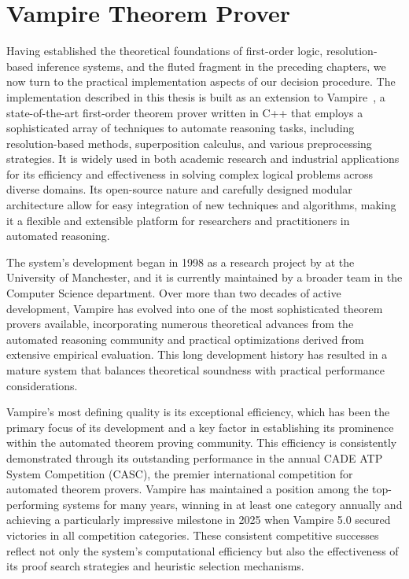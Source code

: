 \chapter{Vampire Theorem Prover}\label{chap:vampire-theorem-prover}
Having established the theoretical foundations of first-order logic, resolution-based inference systems, and the fluted fragment in the preceding chapters, we now turn to the practical implementation aspects of our decision procedure.
The implementation described in this thesis is built as an extension to Vampire~\cite{kovacs2013vampire,AVATAR,riazanov2002design}, a state-of-the-art first-order theorem prover written in C++ that employs a sophisticated array of techniques to automate reasoning tasks, including resolution-based methods, superposition calculus, and various preprocessing strategies.
It is widely used in both academic research and industrial applications for its efficiency and effectiveness in solving complex logical problems across diverse domains.
Its open-source nature and carefully designed modular architecture allow for easy integration of new techniques and algorithms, making it a flexible and extensible platform for researchers and practitioners in automated reasoning.

The system's development began in 1998 as a research project by \citeauthor{riazanov2002design} at the University of Manchester, and it is currently maintained by a broader team in the Computer Science department.
Over more than two decades of active development, Vampire has evolved into one of the most sophisticated theorem provers available, incorporating numerous theoretical advances from the automated reasoning community and practical optimizations derived from extensive empirical evaluation.
This long development history has resulted in a mature system that balances theoretical soundness with practical performance considerations.

Vampire's most defining quality is its exceptional efficiency, which has been the primary focus of its development and a key factor in establishing its prominence within the automated theorem proving community.
This efficiency is consistently demonstrated through its outstanding performance in the annual CADE ATP System Competition (CASC), the premier international competition for automated theorem provers.
Vampire has maintained a position among the top-performing systems for many years, winning in at least one category annually and achieving a particularly impressive milestone in 2025 when Vampire 5.0 secured victories in all competition categories.
These consistent competitive successes reflect not only the system's computational efficiency but also the effectiveness of its proof search strategies and heuristic selection mechanisms.


